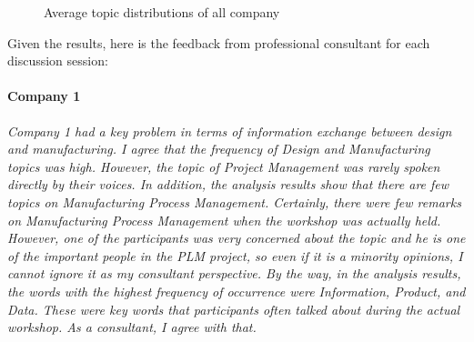 \documentclass[conference]{IEEEtran}
\begin{document}
\begin{figure}[t]
\caption{Average topic distributions of all company}
\label{fig_c}
\end{figure}

Given the results, here is the feedback from professional consultant for each discussion session:

\paragraph{Company 1}{\it Company 1 had a key problem in terms of information exchange between design and manufacturing. I agree that the frequency of Design and Manufacturing topics was high. However, the topic of Project Management was rarely spoken directly by their voices. In addition, the analysis results show that there are few topics on Manufacturing Process Management. Certainly, there were few remarks on Manufacturing Process Management when the workshop was actually held. However, one of the participants was very concerned about the topic and he is one of the important people in the PLM project, so even if it is a minority opinions, I cannot ignore it as my consultant perspective. By the way, in the analysis results, the words with the highest frequency of occurrence were Information, Product, and Data. These were key words that participants often talked about during the actual workshop. As a consultant, I agree with that.}
\end{document}
